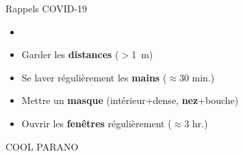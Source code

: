 \documentclass[french,c,
hyperref={%
    pdftitle={Rappels COVID-19},%
    pdfauthor={Guillaume MULLER},%
    pdfsubject={COVID-19},%
    pdfkeywords={COVID-19}%
    colorlinks=true,%
    urlcolor=blue,%
    linkcolor=%
  },%
xcolor={pdftex,svgnames}, %
]{beamer}  %
\begin{document}
\begin{frame}{Rappels COVID-19}
  \begin{itemize}
    \item[]  \hspace{.5cm}
\\
    \item[]  \hspace{.5cm}
      Garder les \textbf{distances} { \scriptsize ($>$1~m) }
    \item[]  \hspace{.5cm}
      Se laver régulièrement les \textbf{mains} { \scriptsize ($\approx$30 min.) }
    \item[]  \hspace{.5cm}
      Mettre un \textbf{masque} { \scriptsize (intérieur+dense, \textbf{nez}+bouche) }
    \item[]  \hspace{.5cm}
      Ouvrir les \textbf{fenêtres} régulièrement { \scriptsize ($\approx$3 hr.)}
  \end{itemize}

\bigskip
COOL  PARANO


\end{frame}
\end{document}
